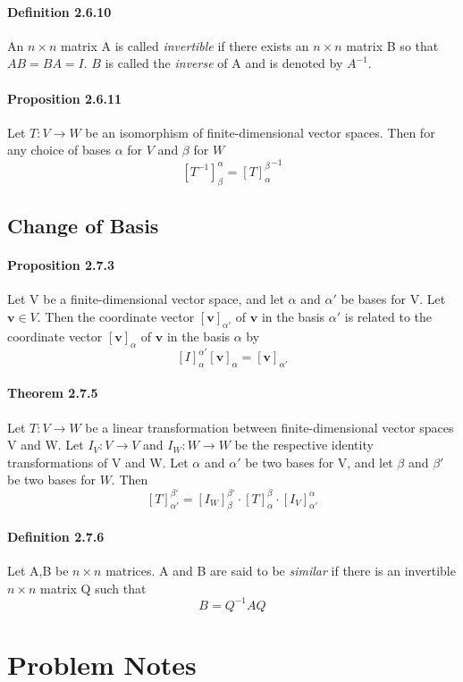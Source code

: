 \documentclass[11pt]{article}
\newcommand{\ti}[1]{\textit{#1}}
\newcommand{\tb}[1]{\textbf{#1}}
\newcommand{\litran}[0]{$T: V \rightarrow W$ }
\newcommand{\vv}[0]{\tb{v}}
\begin{document}
{\paragraph{Definition 2.6.10} An $n \times n$ matrix A is called \ti{invertible} if there exists an $n\times n$ matrix B so that $AB = BA = I$. $B$ is called the \ti{inverse} of A and is denoted by $A^{-1}$.
\paragraph{Proposition 2.6.11} Let \litran be an isomorphism of finite-dimensional vector spaces. Then for any choice of bases $\alpha$ for $V$ and $\beta$ for $W$
$$[T^{-1}]_\beta^\alpha = {[T]_\alpha^{\beta}}^{-1}$$

\subsection{Change of Basis}
\paragraph{Proposition 2.7.3} Let V be a finite-dimensional vector space, and let $\alpha$ and $\alpha'$ be bases for V. Let $\vv \in V$. Then the coordinate vector $[\vv]_{\alpha'}$ of $\vv$ in the basis $\alpha'$ is related to the coordinate vector $[\vv]_\alpha$ of $\vv$ in the basis $\alpha$ by $$[I]_\alpha^{\alpha'}[\vv]_\alpha = [\vv]_{\alpha'}$$
\paragraph{Theorem 2.7.5} Let \litran be a linear transformation between finite-dimensional vector spaces V and W. Let $I_V: V \rightarrow V$ and $I_W: W \rightarrow W$ be the respective identity transformations of V and W. Let $\alpha$ and $\alpha'$ be two bases for V, and let $\beta$ and $\beta'$ be two bases for $W$. Then
$$[T]_{\alpha'}^{\beta'} = [I_W]_\beta^{\beta'}\cdot[T]_\alpha^\beta\cdot[I_V]_{\alpha'}^{\alpha}$$
\paragraph{Definition 2.7.6} Let A,B be $n \times n$ matrices. A and B are said to be \ti{similar} if there is an invertible $n\times n$ matrix Q such that
$$B = Q^{-1}AQ$$





\section{Problem Notes}
}
\end{document}
